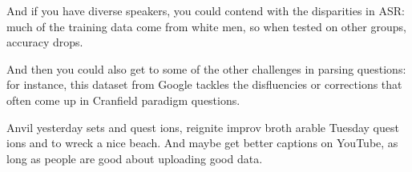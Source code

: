And if you have diverse speakers, you could contend with the disparities in ASR: much of the training data come from white men, so when tested on other groups, accuracy drops.

And then you could also get to some of the other challenges in parsing questions: for instance, this dataset from Google tackles the disfluencies or corrections that often come up in Cranfield paradigm questions.

Anvil yesterday sets and quest ions, reignite improv broth arable Tuesday quest ions and to wreck a nice beach.  And maybe get better captions on YouTube, as long as people are good about uploading good data.


